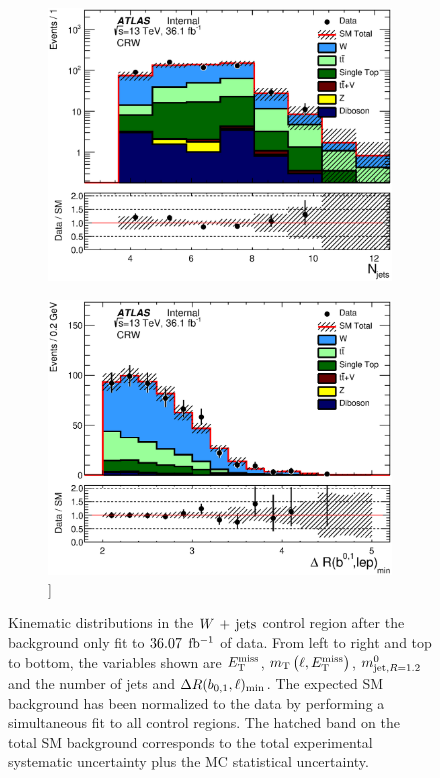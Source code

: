 \begin{figure}[!h]
\begin{subfigure}[b]{0.40\textwidth}
                \caption{ }
    \end{subfigure}
      \begin{subfigure}[b]{0.40\textwidth}    
  \includegraphics[width=\textwidth]{figures/wJets/postfit/NJets_CRW_log.eps}
                \caption{ }
    \end{subfigure}
      \begin{subfigure}[b]{0.40\textwidth}    
  \includegraphics[width=\textwidth]{figures/wJets/postfit/MinDRBLep_CRW.eps}]
                \caption{ }
    \end{subfigure}
  \caption[Kinematic distributions in the $\Wjets$ control region after the background only fit to $\intlumi$ $\ifb$ of data]{Kinematic distributions in the $\Wjets$ control region after the background only fit to $\intlumi$ $\ifb$ of data. From left to right and top to bottom, the variables shown are $E_{\mathrm{T}}^{\mathrm{miss}}$, $m_{\mathrm{T}}\left(\ell,E_{\mathrm{T}}^{\mathrm{miss}}\right)$, $m^{0}_{\mathrm{jet,}R=1.2}$ and the number of jets and $\Delta R(b_{0,1},\ell)_{\mathrm{min}}$. The expected SM background has been normalized to the data by performing a simultaneous fit to all control regions.  The hatched band on the total SM background corresponds to the total experimental systematic uncertainty plus the MC statistical uncertainty.}
  \label{fig:CRWpts}
\end{figure}

